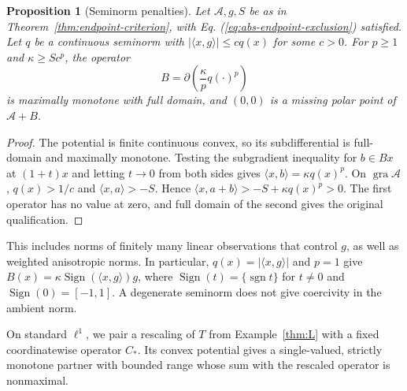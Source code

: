 \documentclass[11pt]{article}
\newcommand{\gra}{\operatorname{gra}}
\newcommand{\pair}[2]{\langle #1,#2\rangle}
\newtheorem{proposition}{Proposition}
\theoremstyle{definition}
\theoremstyle{remark}
\begin{document}
\begin{proposition}[Seminorm penalties]
\label{cor:seminorm-partners}
Let $\mathcal A,g,S$ be as in Theorem~\ref{thm:endpoint-criterion}, with Eq. (\ref{eq:abs-endpoint-exclusion}) satisfied. Let $q$ be a continuous seminorm with $|\pair{x}{g}|\le c q(x)$ for some $c>0$. For $p\ge1$ and $\kappa\ge Sc^p$, the operator
\[
B=\partial\left(\frac\kappa p q(\cdot)^p\right)
\]
is maximally monotone with full domain, and $(0,0)$ is a missing polar point of $\mathcal A+B$.
\end{proposition}
\begin{proof}
The potential is finite continuous convex, so its subdifferential is full-domain and maximally monotone. Testing the subgradient inequality for $b\in Bx$ at $(1+t)x$ and letting $t\to0$ from both sides gives $\pair{x}{b}=\kappa q(x)^p$. On $\gra\mathcal A$, $q(x)>1/c$ and $\pair{x}{a}>-S$. Hence $\pair{x}{a+b}>-S+\kappa q(x)^p>0$. The first operator has no value at zero, and full domain of the second gives the original qualification.
\end{proof}

This includes norms of finitely many linear observations that control $g$, as well as weighted anisotropic norms. In particular, $q(x)=|\pair{x}{g}|$ and $p=1$ give $B(x)=\kappa\operatorname{Sign}(\pair{x}{g})g$, where $\operatorname{Sign}(t)=\{\operatorname{sgn}t\}$ for $t\ne0$ and $\operatorname{Sign}(0)=[-1,1]$. A degenerate seminorm does not give coercivity in the ambient norm.

On standard $\ell^1$, we pair a rescaling of $T$ from Example~\ref{thm:L} with a fixed coordinatewise operator $C_*$. Its convex potential gives a single-valued, strictly monotone partner with bounded range whose sum with the rescaled operator is nonmaximal.
\end{document}
